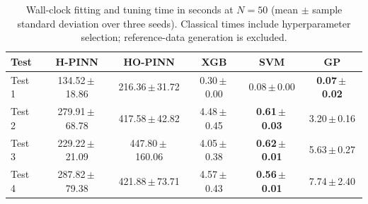 \begin{table}[!htbp]
\centering
\small
\setlength{\tabcolsep}{3.5pt}
\caption{Wall-clock fitting and tuning time in seconds at $N=50$ (mean $\pm$ sample standard deviation over three seeds). Classical times include hyperparameter selection; reference-data generation is excluded.}
\label{tab:runtime}
\begin{tabular}{lccccc}
\toprule
Test & H-PINN & HO-PINN & XGB & SVM & GP \\
\midrule
Test 1 & 134.52\,$\pm$\,18.86 & 216.36\,$\pm$\,31.72 & 0.30\,$\pm$\,0.00 & 0.08\,$\pm$\,0.00 & \textbf{0.07\,$\pm$\,0.02} \\
Test 2 & 279.91\,$\pm$\,68.78 & 417.58\,$\pm$\,42.82 & 4.48\,$\pm$\,0.45 & \textbf{0.61\,$\pm$\,0.03} & 3.20\,$\pm$\,0.16 \\
Test 3 & 229.22\,$\pm$\,21.09 & 447.80\,$\pm$\,160.06 & 4.05\,$\pm$\,0.38 & \textbf{0.62\,$\pm$\,0.01} & 5.63\,$\pm$\,0.27 \\
Test 4 & 287.82\,$\pm$\,79.38 & 421.88\,$\pm$\,73.71 & 4.57\,$\pm$\,0.43 & \textbf{0.56\,$\pm$\,0.01} & 7.74\,$\pm$\,2.40 \\
\bottomrule
\end{tabular}
\end{table}
